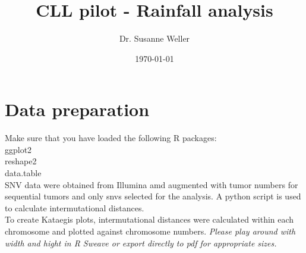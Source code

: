\documentclass[a4paper,11pt]{article}
\title{CLL pilot - Rainfall analysis}
\author{Dr. Susanne Weller}
\date{\today}
\begin{document}


\maketitle
\tableofcontents

\section{Data preparation}
Make sure that you have loaded the following R packages:\\
ggplot2\\
reshape2\\
data.table\\
SNV data were obtained from Illumina amd augmented with tumor numbers for sequential tumors and only snvs selected for the analysis. A python script is used to calculate intermutational distances.\\
To create Kataegis plots, intermutational distances were calculated within each chromosome and plotted against chromosome numbers.
\emph{Please play around with width and hight in R Sweave or export directly to pdf for appropriate sizes.}
\end{document}
